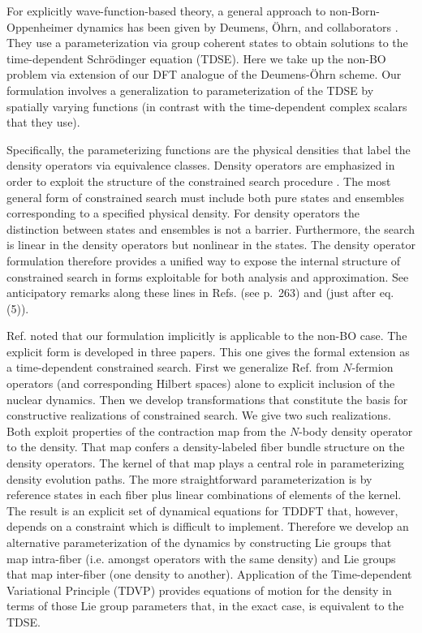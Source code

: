 \documentclass[aps,preprint]{revtex4}%
\begin{document}
For explicitly wave-function-based theory, a general approach to
non-Born-Oppenheimer dynamics has been given by Deumens, \"Ohrn, and
collaborators \cite{DeumensA,DeumensB}. They use a parameterization via group
coherent states to obtain solutions to the time-dependent Schr\"odinger
equation (TDSE). Here we take up the non-BO problem via extension of our DFT
analogue \cite{BLWSBT99a,BLWSBT00a} of the Deumens-\"Ohrn scheme. Our
formulation involves a generalization to parameterization of the TDSE by
spatially varying functions (in contrast with the time-dependent complex
scalars that they use).

Specifically, the parameterizing functions are the physical densities that
label the density operators via equivalence classes. Density operators are
emphasized in order to exploit the structure of the constrained search
procedure \cite{Levy79,LevyPerdew85}. The most general form of constrained
search must include both pure states and ensembles corresponding to a
specified physical density. For density operators the distinction between
states and ensembles is not a barrier. Furthermore, the search is linear in
the density operators but nonlinear in the states. The density operator
formulation therefore provides a unified way to expose the internal structure
of constrained search in forms exploitable for both analysis and
approximation. See anticipatory remarks along these lines in Refs. \cite{Lieb}
(see p.~263) and \cite{KD86} (just after eq. (5)).

Ref.  noted that our formulation implicitly is applicable
to the non-BO case. The explicit form is developed in three papers. This one
gives the formal extension as a time-dependent constrained search. First we
generalize Ref.  from $N$-fermion operators (and
corresponding Hilbert spaces) alone to explicit inclusion of the nuclear
dynamics. Then we develop transformations that constitute the basis for
constructive realizations of constrained search. We give two such
realizations. Both exploit properties of the contraction map from the $N$-body
density operator to the density. That map confers a density-labeled fiber
bundle structure on the density operators. The kernel of that map plays a
central role in parameterizing density evolution paths. The more
straightforward parameterization is by reference states in each fiber plus
linear combinations of elements of the kernel. The result is an explicit set
of dynamical equations for TDDFT that, however, depends on a constraint which
is difficult to implement. Therefore we develop an alternative
parameterization of the dynamics by constructing Lie groups that map
intra-fiber (i.e. amongst operators with the same density) and Lie groups that
map inter-fiber (one density to another). Application of the Time-dependent
Variational Principle (TDVP) provides equations of motion for the density in
terms of those Lie group parameters that, in the exact case, is equivalent to
the TDSE.
\end{document}
